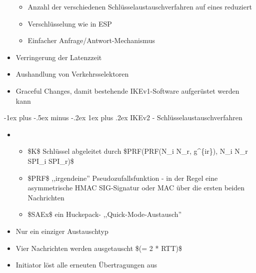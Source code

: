 \documentclass[a4paper]{article}
\makeatletter
\renewcommand{\subsubsection}{\@startsection{subsubsection}{3}{0mm}%
 {-1ex plus -.5ex minus -.2ex}%
 {1ex plus .2ex}%
 {\normalfont\small\bfseries}}
\makeatother
\begin{document}
\begin{multicols}{3}
\begin{itemize}
              \begin{itemize}
                  \item
                        Anzahl der verschiedenen Schlüsselaustauschverfahren auf eines
                        reduziert
                  \item
                        Verschlüsselung wie in ESP
                  \item
                        Einfacher Anfrage/Antwort-Mechanismus
              \end{itemize}
        \item
              Verringerung der Latenzzeit
        \item
              Aushandlung von Verkehrsselektoren
        \item
              Graceful Changes, damit bestehende IKEv1-Software aufgerüstet werden
              kann
    \end{itemize}


    \subsubsection{IKEv2 -
        Schlüsselaustauschverfahren}

    \begin{itemize}
        \item

              \begin{itemize}
                  \item
                        \$K\$ Schlüssel abgeleitet durch \$PRF(PRF(N\_i \textbar\textbar{}
                        N\_r, g\^{}\{ir\}), N\_i \textbar\textbar{} N\_r \textbar\textbar{}
                        SPI\_i \textbar\textbar{} SPI\_r)\$
                  \item
                        \$PRF\$ ,,irgendeine'' Pseudozufallsfunktion - in der Regel eine
                        asymmetrische HMAC SIG-Signatur oder MAC über die ersten beiden
                        Nachrichten
                  \item
                        \$SAEx\$ ein Huckepack- ,,Quick-Mode-Austausch''
              \end{itemize}
        \item
              Nur ein einziger Austauschtyp
        \item
              Vier Nachrichten werden ausgetauscht \$(= 2 * RTT)\$
        \item
              Initiator löst alle erneuten Übertragungen aus
    \end{itemize}



\end{multicols}
\end{document}
